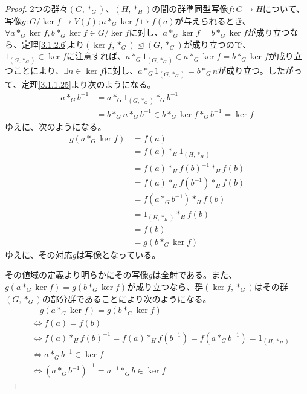 \documentclass[dvipdfmx]{jsarticle}
\begin{document}
\begin{proof}
2つの群々$\left( G,*_{G} \right)$、$\left( H,*_{H} \right)$の間の群準同型写像$f:G \rightarrow H$について、写像$g:{G}/{\ker f} \rightarrow V(f);a*_{G}\ker f \mapsto f(a)$が与えられるとき、$\forall a*_{G}\ker f,b*_{G}\ker f \in {G}/{\ker f}$に対し、$a*_{G}\ker f = b*_{G}\ker f$が成り立つなら、定理\ref{3.1.2.6}より$\left( \ker f,*_{G} \right) \trianglelefteq \left( G,*_{G} \right)$が成り立つので、$1_{\left( G,*_{G} \right)} \in \ker f$に注意すれば、$a*_{G}1_{\left( G,*_{G} \right)} \in a*_{G}\ker f = b*_{G}\ker f$が成り立つことにより、$\exists n \in \ker f$に対し、$a*_{G}1_{\left( G,*_{G} \right)} = b*_{G}n$が成り立つ。したがって、定理\ref{3.1.1.25}より次のようになる。
\begin{align*}
a*_{G}b^{- 1} &= a*_{G}1_{\left( G,*_{G} \right)}*_{G}b^{- 1}\\
&= b*_{G}n*_{G}b^{- 1} \in b*_{G}\ker f*_{G}b^{- 1} = \ker f
\end{align*}
ゆえに、次のようになる。
\begin{align*}
g\left( a*_{G}\ker f \right) &= f(a)\\
&= f(a)*_{H}1_{\left( H,*_{H} \right)}\\
&= f(a)*_{H}{f(b)}^{- 1}*_{H}f(b)\\
&= f(a)*_{H}f\left( b^{- 1} \right)*_{H}f(b)\\
&= f\left( a*_{G}b^{- 1} \right)*_{H}f(b)\\
&= 1_{\left( H,*_{H} \right)}*_{H}f(b)\\
&= f(b)\\
&= g\left( b*_{G}\ker f \right)
\end{align*}
ゆえに、その対応$g$は写像となっている。\par
その値域の定義より明らかにその写像$g$は全射である。また、$g\left( a*_{G}\ker f \right) = g\left( b*_{G}\ker f \right)$が成り立つなら、群$\left( \ker f,*_{G} \right)$はその群$\left( G,*_{G} \right)$の部分群であることにより次のようになる。
\begin{align*}
&\quad g\left( a*_{G}\ker f \right) = g\left( b*_{G}\ker f \right) \\
&\Leftrightarrow f(a) = f(b)\\
&\Leftrightarrow f(a)*_{H}{f(b)}^{- 1} = f(a)*_{H}f\left( b^{- 1} \right) = f\left( a*_{G}b^{- 1} \right) = 1_{\left( H,*_{H} \right)}\\
&\Leftrightarrow a*_{G}b^{- 1} \in \ker f\\
&\Leftrightarrow \left( a*_{G}b^{- 1} \right)^{- 1} = a^{- 1}*_{G}b \in \ker f

\end{align*}
\end{proof}
\end{document}
